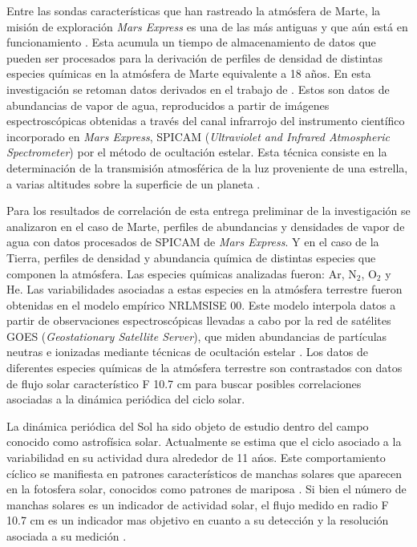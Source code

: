 \documentclass[a4paper,alpha-refs]{eSpectra}
\begin{document}
Entre las sondas caracter\'isticas que han rastreado la atm\'osfera de Marte, la misi\'on de exploraci\'on \textit{Mars Express} es una de las m\'as antiguas y que a\'un est\'a en funcionamiento \citep{Mars_Express}. Esta acumula un tiempo de almacenamiento de datos que pueden ser procesados para la derivaci\'on de perfiles de densidad de distintas especies qu\'imicas en la atm\'osfera de Marte equivalente a 18 a\~nos. En esta investigaci\'on se retoman datos derivados en el trabajo de \cite{spicam_fedorova_H2O_2021}. Estos son datos de abundancias de vapor de agua, reproducidos a partir de im\'agenes espectrosc\'opicas obtenidas a trav\'es del canal infrarrojo del instrumento cient\'ifico incorporado en \textit{Mars Express}, SPICAM (\textit{Ultraviolet and Infrared Atmospheric Spectrometer}) por el m\'etodo de ocultaci\'on estelar. Esta t\'ecnica consiste en la determinaci\'on de la transmisi\'on atmosf\'erica de la luz proveniente de una estrella, a varias altitudes sobre la superficie de un planeta \citep{estelar_ocult_2006}.

Para los resultados de correlaci\'on de esta entrega preliminar de la investigaci\'on se analizaron en el caso de Marte, perfiles de abundancias y densidades de vapor de agua con datos procesados de SPICAM de \textit{Mars Express}. Y en el caso de la Tierra, perfiles de densidad y abundancia qu\'imica de distintas especies que componen la atm\'osfera. Las especies qu\'imicas analizadas fueron: Ar, N$_2$, O$_2$ y He. Las variabilidades asociadas a estas especies en la atm\'osfera terrestre fueron obtenidas en  el modelo emp\'irico NRLMSISE 00. Este modelo interpola datos a partir de observaciones espectrosc\'opicas llevadas a cabo por la red de sat\'elites GOES (\textit{Geostationary Satellite Server}), que miden abundancias de part\'iculas neutras e ionizadas mediante t\'ecnicas de ocultaci\'on estelar \citep{estelar_ocult_2006}. Los datos de diferentes especies qu\'imicas de la atm\'osfera terrestre son contrastados con datos de flujo solar caracter\'istico F 10.7 cm para buscar posibles correlaciones asociadas a la din\'amica peri\'odica del ciclo solar. 

La din\'amica peri\'odica del Sol ha sido objeto de estudio dentro del campo conocido como astrof\'isica solar. Actualmente se estima que el ciclo asociado a la variabilidad en su actividad dura
alrededor de 11 a\'nos. Este comportamiento c\'iclico se manifiesta en patrones caracter\'isticos de
manchas solares que aparecen en la fotosfera solar, conocidos como patrones de mariposa \citep{Maunder_2021}. Si bien el n\'umero de manchas solares es un indicador de actividad solar, el flujo medido en radio F 10.7 cm es un indicador mas objetivo en cuanto a su detecci\'on y la resoluci\'on asociada a su medici\'on \cite{Lemon_2018}.  
\end{document}
